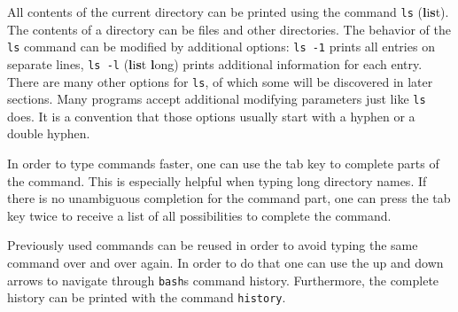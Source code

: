 All contents of the current directory can be printed using the command \lstinline{ls} (\textbf{l}i\textbf{s}t). The contents of a directory can be files and other directories. The behavior of the \lstinline{ls} command can be modified by additional options: \lstinline{ls -1} prints all entries on separate lines, \lstinline{ls -l} (\textbf{l}i\textbf{s}t \textbf{l}ong) prints additional information for each entry. There are many other options for \lstinline{ls}, of which some will be discovered in later sections. Many programs accept additional modifying parameters just like \lstinline{ls} does. It is a convention that those options usually start with a hyphen or a double hyphen.

In order to type commands faster, one can use the tab key to complete parts of the command. This is especially helpful when typing long directory names. If there is no unambiguous completion for the command part, one can press the tab key twice to receive a list of all possibilities to complete the command.

Previously used commands can be reused in order to avoid typing the same command over and over again. In order to do that one can use the up and down arrows to navigate through \lstinline{bash}s command history. Furthermore, the complete history can be printed with the command \lstinline{history}.
